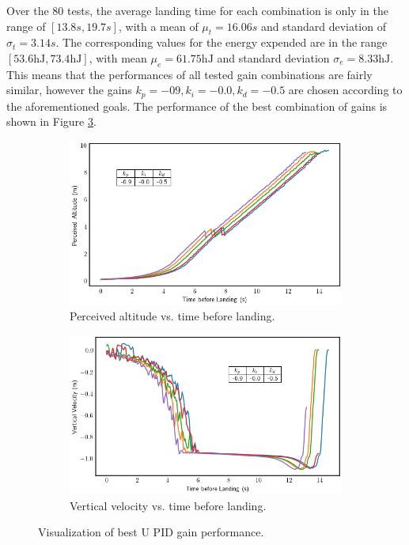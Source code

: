 Over the 80 tests, the average landing time for each combination is only in the range of $\left[ 13.8s, 19.7s \right]$, with a mean of $\mu_t = 16.06s$ and standard deviation of $\sigma_t = 3.14s$. The corresponding values for the energy expended are in the range $\left[ 53.6 \mathrm{hJ}, 73.4 \mathrm{hJ} \right]$, with mean $\mu_e = 61.75 \mathrm{hJ}$ and standard deviation $\sigma_e = 8.33 \mathrm{hJ}$. This means that the performances of all tested gain combinations are fairly similar, however the gains $k_p=-09, k_i=-0.0, k_d=-0.5$ are chosen according to the aforementioned goals. The performance of the best combination of gains is shown in Figure \ref{fig:best_u_pid_gains}.

\begin{figure}[ht]
    \centering
    \begin{subfigure}[b]{0.49\textwidth}
        \centering
        \includegraphics[width=\textwidth]{images/best_pid_u_altitude.png}
        \caption{Perceived altitude vs. time before landing.}
        \label{subfig:best_initial_pid_u_altitude}
    \end{subfigure}
    \begin{subfigure}[b]{0.49\textwidth}
        \centering
        \includegraphics[width=\textwidth]{images/best_pid_u_velocity.png}
        \caption{Vertical velocity vs. time before landing.}
        \label{subfig:best_initial_pid_u_velocity}
    \end{subfigure}
    \caption{Visualization of best U PID gain performance.}
    \label{fig:best_u_pid_gains}
\end{figure}

